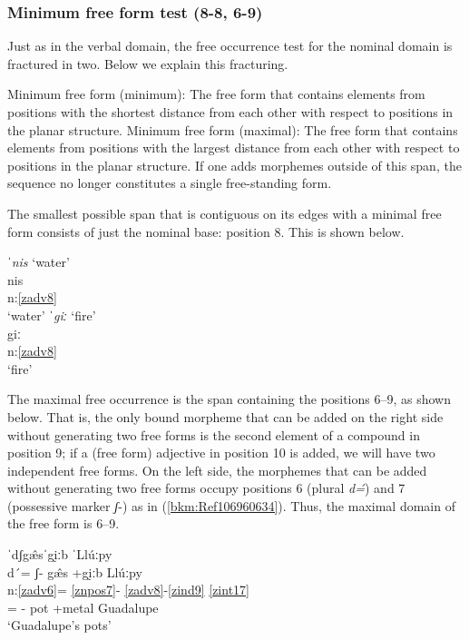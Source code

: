 \documentclass[output=paper]{langscibook}
\begin{document}
\subsubsection{  Minimum free form test (8-8, 6-9)}

Just as in the verbal domain, the free occurrence test for the nominal domain is fractured in two. Below we explain this fracturing.

\ea\label{ex:key:zap:96}
Minimum free form (minimum): The free form that contains elements from positions with the shortest distance from each other with respect to positions in the planar structure.
\ex\label{ex:key:zap:97}
Minimum free form (maximal): The free form that contains elements from positions with the largest distance from each other with respect to positions in the planar structure. If one adds morphemes outside of this span, the sequence no longer constitutes a single free-standing form.
\z

The smallest possible span that is contiguous on its edges with a minimal free form consists of just the nominal base: position 8. This is shown below. 

\ea\label{ex:key:zap:98}
{ˈ\textit{nis} `water'}\\
\gll nis\\
n:\ref{zadv8} \\
\glt `water'
\ex\label{ex:key:zap:99}
{ˈ\textit{giː} `fire'}\\
\gll giː\\
n:\ref{zadv8} \\
\glt`fire'
\z

\hspace*{-2.4pt}The maximal free occurrence is the span containing the positions 6--9, as shown below. That is, the only bound morpheme that can be added on the right side without generating two free forms is the second element of a compound in position 9; if a (free form) adjective in position 10 is added, we will have two independent free forms. On the left side, the morphemes that can be added without generating two free forms occupy positions 6 (plural \textit{d\'{=}}) and 7 (possessive marker \textit{ʃ}-) as in (\ref{bkm:Ref106960634}). Thus, the maximal domain of the free form is 6--9.

\ea\label{bkm:Ref106960634}
{ˈdʃg\^{æ}sˈgḭːb ˈLlúːpy}\\
\glll d´= ʃ{}- g\^{æ}s +gḭːb Llúːpy\\
n:\ref{zadv6}= \ref{znpos7}- \ref{zadv8}-\ref{zind9} {} \ref{zint17}\\
\Pl{}= \Poss{}- pot +metal Guadalupe\\
\glt `Guadalupe's pots'
\z
\end{document}
